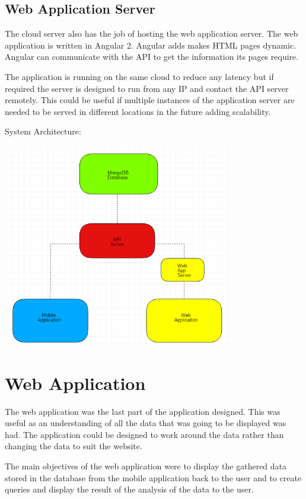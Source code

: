 \subsection{Web Application Server}
The cloud server also has the job of hosting the web application server. The web application is written in Angular 2. Angular adds makes HTML pages dynamic. Angular can communicate with the API to get the information its pages require.

The application is running on the same cloud to reduce any latency but if required the server is designed to run from any IP and contact the API server remotely. This could be useful if multiple instances of the application server are needed to be served in different locations in the future adding scalability.

System Architecture:
\begin{center}    
    \includegraphics[width=100mm]{img/architecture.png}
\end{center}

\section{Web Application}
The web application was the last part of the application designed. This was useful as an understanding of all the data that was going to be displayed was had. The application could be designed to work around the data rather than changing the data to suit the website.

The main objectives of the web application were to display the gathered data stored in the database from the mobile application back to the user and to create queries and display the result of the analysis of the data to the user. \\

